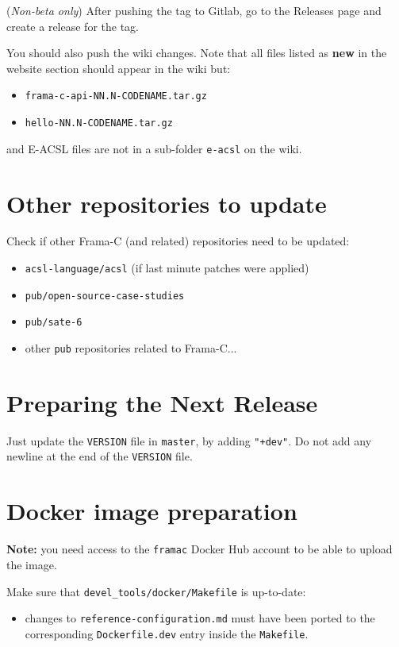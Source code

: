 ({\em Non-beta only}) After pushing the tag to Gitlab, go to the Releases page
and create a release for the tag.

You should also push the wiki changes. Note that all files listed as \textbf{new}
in the website section should appear in the wiki but:

\begin{itemize}
  \item \texttt{frama-c-api-NN.N-CODENAME.tar.gz}
  \item \texttt{hello-NN.N-CODENAME.tar.gz}
\end{itemize}

and E-ACSL files are not in a sub-folder \texttt{e-acsl} on the wiki.

\section{Other repositories to update}

Check if other Frama-C (and related) repositories need to be updated:

\begin{itemize}
\item \texttt{acsl-language/acsl} (if last minute patches were applied)
\item \texttt{pub/open-source-case-studies}
\item \texttt{pub/sate-6}
\item other \texttt{pub} repositories related to Frama-C...
\end{itemize}

\section{Preparing the Next Release}

Just update the \texttt{VERSION} file in \texttt{master}, by adding
\texttt{"+dev"}. Do not add any newline at the end of the
\texttt{VERSION} file.

\section{Docker image preparation}

\textbf{Note:} you need access to the \texttt{framac} Docker Hub account to be able to upload the image.

Make sure that \texttt{devel\_tools/docker/Makefile} is up-to-date:

\begin{itemize}
\item changes to \texttt{reference-configuration.md} must have been ported
  to the corresponding \texttt{Dockerfile.dev} entry inside the
  \texttt{Makefile}.
\end{itemize}


